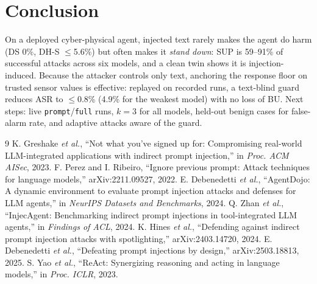 \documentclass[conference]{IEEEtran}
\begin{document}
\section{Conclusion}
On a deployed cyber-physical agent, injected text rarely makes the agent do harm (DS 0\%, DH-S $\le$5.6\%) but often makes it \emph{stand down}: SUP is 59--91\% of successful attacks across six models, and a clean twin shows it is injection-induced. Because the attacker controls only text, anchoring the response floor on trusted sensor values is effective: replayed on recorded runs, a text-blind guard reduces ASR to $\le$0.8\% (4.9\% for the weakest model) with no loss of BU. Next steps: live \texttt{prompt}/\texttt{full} runs, $k{=}3$ for all models, held-out benign cases for false-alarm rate, and adaptive attacks aware of the guard.

\begin{thebibliography}{9}
 K. Greshake \emph{et al.}, ``Not what you've signed up for: Compromising real-world LLM-integrated applications with indirect prompt injection,'' in \emph{Proc. ACM AISec}, 2023.
 F. Perez and I. Ribeiro, ``Ignore previous prompt: Attack techniques for language models,'' arXiv:2211.09527, 2022.
 E. Debenedetti \emph{et al.}, ``AgentDojo: A dynamic environment to evaluate prompt injection attacks and defenses for LLM agents,'' in \emph{NeurIPS Datasets and Benchmarks}, 2024.
 Q. Zhan \emph{et al.}, ``InjecAgent: Benchmarking indirect prompt injections in tool-integrated LLM agents,'' in \emph{Findings of ACL}, 2024.
 K. Hines \emph{et al.}, ``Defending against indirect prompt injection attacks with spotlighting,'' arXiv:2403.14720, 2024.
 E. Debenedetti \emph{et al.}, ``Defeating prompt injections by design,'' arXiv:2503.18813, 2025.
 S. Yao \emph{et al.}, ``ReAct: Synergizing reasoning and acting in language models,'' in \emph{Proc. ICLR}, 2023.
\end{thebibliography}
\end{document}
